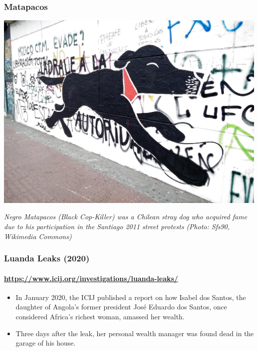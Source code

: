 \documentclass[aspectratio=169,usenames,dvipsnames]{beamer}
\begin{document}
\begin{frame}[c]
  \frametitle{Matapacos}

  \centering

  \includegraphics[width=\textwidth,height=0.7\textheight,keepaspectratio]{img/matapacos.jpg}

  \footnotesize
  \emph{Negro Matapacos (Black Cop-Killer) was a Chilean stray dog who
  acquired fame due to his participation in the Santiago 2011 street protests
  (Photo: Sfs90, Wikimedia Commons)}

\end{frame}

\begin{frame}
  \frametitle{Luanda Leaks (2020)}
  \framesubtitle{\url{https://www.icij.org/investigations/luanda-leaks/}}

  \begin{itemize}[<+->]
    \item In January 2020, the ICIJ published a report on how Isabel dos
      Santos, the daughter of Angola's former president José Eduardo dos
      Santos, once considered Africa's richest woman, amassed her wealth.
    \item Three days after the leak, her personal wealth manager was found
      dead in the garage of his house.
  \end{itemize}
\end{frame}
\end{document}
